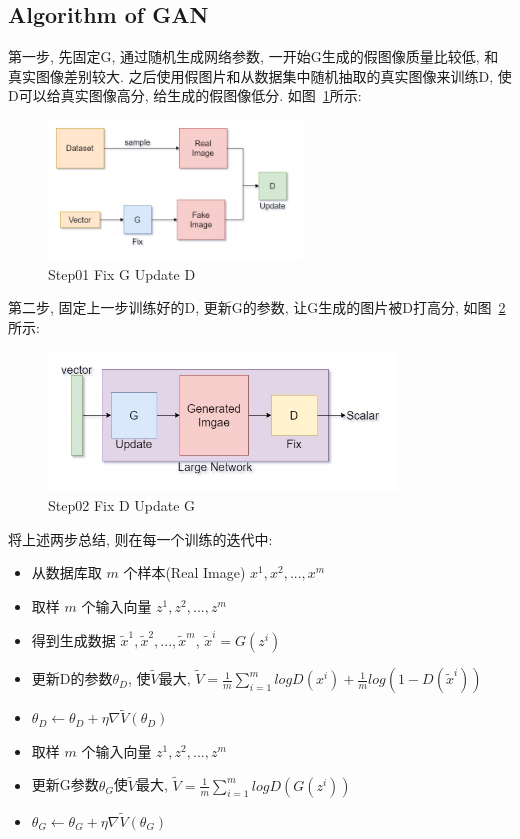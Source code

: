 \subsection{Algorithm of GAN}
第一步, 先固定G, 通过随机生成网络参数, 一开始G生成的假图像质量比较低, 和真实图像差别较大. 之后使用假图片和从数据集中随机抽取的真实图像来训练D, 使D可以给真实图像高分, 给生成的假图像低分. 如图~\ref{fig:0202}所示:
\begin{figure}[!htbp]
    \centering
    \includegraphics[height=10em]{pic/pic0202.jpg}
    \caption{Step01 Fix G Update D}
    \label{fig:0202}
\end{figure}

第二步, 固定上一步训练好的D, 更新G的参数, 让G生成的图片被D打高分, 如图~\ref{fig:0203}所示:
\begin{figure}[!htbp]
    \centering
    \includegraphics[height=10em]{pic/pic0203.jpg}
    \caption{Step02 Fix D Update G}
    \label{fig:0203}
\end{figure}

将上述两步总结, 则在每一个训练的迭代中:
\begin{itemize}
    \item 从数据库取 $m$ 个样本(Real Image) ${x^{1}, x^{2}, ..., x^{m}}$
    \item 取样 $m$ 个输入向量 ${z^{1}, z^{2}, ..., z^{m}}$
    \item 得到生成数据 ${\tilde{x}^{1}, \tilde{x}^{2}, ..., \tilde{x}^{m}}$, $\tilde{x}^{i}=G(z^{i})$
    \item 更新D的参数$\theta_{D}$, 使$\tilde{V}$最大, $\tilde{V}=\frac{1}{m}\sum_{i=1}^{m}logD(x^{i})+\frac{1}{m}log(1-D(\tilde{x}^{i}))$
    \item $\theta_{D} \gets \theta_{D} + \eta\nabla\tilde{V}(\theta_{D})$
    \item 取样 $m$ 个输入向量 ${z^{1}, z^{2}, ..., z^{m}}$
    \item 更新G参数$\theta_{G}$使$\tilde{V}$最大, $\tilde{V}=\frac{1}{m}\sum_{i=1}^{m}logD(G(z^{i}))$
    \item $\theta_{G} \gets \theta_{G} + \eta\nabla\tilde{V}(\theta_{G})$
\end{itemize}

